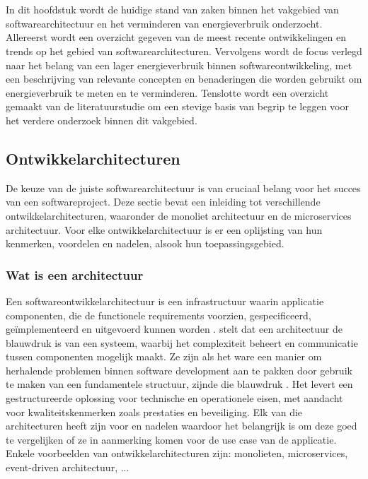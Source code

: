 \chapter{}%
\label{ch:stand-van-zaken}
In dit hoofdstuk wordt de huidige stand van zaken binnen het vakgebied van softwarearchitectuur en het verminderen van energieverbruik onderzocht. Allereerst wordt een overzicht gegeven van de meest recente ontwikkelingen en trends op het gebied van softwarearchitecturen. Vervolgens wordt de focus verlegd naar het belang van een lager energieverbruik binnen softwareontwikkeling, met een beschrijving van relevante concepten en benaderingen die worden gebruikt om energieverbruik te meten en te verminderen. Tenslotte wordt een overzicht gemaakt van de literatuurstudie om een stevige basis van begrip te leggen voor het verdere onderzoek binnen dit vakgebied.


\section{Ontwikkelarchitecturen}
De keuze van de juiste softwarearchitectuur is van cruciaal belang voor het succes van een softwareproject. Deze sectie bevat een inleiding tot verschillende ontwikkelarchitecturen, waaronder de monoliet architectuur en de microservices architectuur. Voor elke ontwikkelarchitectuur is er een oplijsting van hun kenmerken, voordelen en nadelen, alsook hun toepassingsgebied. 

\subsection{Wat is een architectuur}
Een softwareontwikkelarchitectuur is een infrastructuur waarin applicatie componenten, die de functionele requirements voorzien, gespecificeerd, geïmplementeerd en uitgevoerd kunnen worden \autocite{Solms2012}. \textcite{Jaiswal2019} stelt dat een architectuur de blauwdruk is van een systeem, waarbij het complexiteit beheert en communicatie tussen componenten mogelijk maakt. Ze zijn als het ware een manier om herhalende problemen binnen software development aan te pakken door gebruik te maken van een fundamentele structuur, zijnde die blauwdruk \autocite{Dhaduk2020}.  Het levert een gestructureerde oplossing voor technische en operationele eisen, met aandacht voor kwaliteitskenmerken zoals prestaties en beveiliging. Elk van die architecturen heeft zijn voor en nadelen waardoor het belangrijk is om deze goed te vergelijken of ze in aanmerking komen voor de use case van de applicatie. Enkele voorbeelden van ontwikkelarchitecturen zijn: monolieten, microservices, event-driven architectuur, ...

